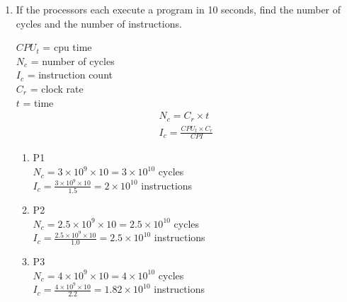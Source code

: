 \documentclass[10pt]{article}
\begin{document}
\begin{enumerate}
\begin{enumerate}
\begin{center}
        \end{center}
        
        \item If the processors each execute a program in 10 seconds, find the number of cycles and the number of instructions.
        \begin{center}
            $CPU_t$ = cpu time\\$N_c$ = number of cycles\\$I_c$ = instruction count\\$C_r$ = clock rate\\$t$ = time
            \begin{align*}
                N_c = C_r \times t\\
                I_c = \frac{CPU_t \times C_r}{CPI}
            \end{align*}
        \end{center}
        \begin{enumerate}
            \item P1 \\$N_c = 3 \times 10^9 \times 10 = 3\times10^{10}$ cycles\\$I_c = \frac{3\times10^9\times10}{1.5} = 2\times10^{10}$ instructions
            \item P2 \\$N_c = 2.5 \times 10^9 \times 10 = 2.5 \times 10^{10}$ cycles\\$I_c = \frac{2.5\times10^9\times10}{1.0} = 2.5\times10^{10}$ instructions
            \item P3 \\$N_c = 4 \times 10^9 \times 10 = 4\times10^{10}$ cycles \\ $I_c = \frac{4\times10^9\times10}{2.2} = 1.82\times10^{10}$ instructions
        \end{enumerate}
        


\end{enumerate}
\end{enumerate}
\end{document}

